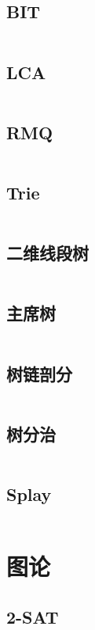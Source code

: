 \documentclass[titlepage,landscape,a4paper,10pt]{article}
\begin{document}
\begin{multicols}{2}
\begin{spacing}{0.8}
\subsection{BIT}
\inputminted{cpp}{DataStructure/BIT.cpp}

\subsection{LCA}
\inputminted{cpp}{DataStructure/LCA.cpp}

\subsection{RMQ}
\inputminted{cpp}{DataStructure/RMQ.cpp}

\subsection{Trie}
\inputminted{cpp}{DataStructure/trie.cpp}

\subsection{二维线段树}
\inputminted{cpp}{DataStructure/二维线段树.cpp}

\subsection{主席树}
\inputminted{cpp}{DataStructure/主席树.cpp}

\subsection{树链剖分}
\inputminted{cpp}{DataStructure/树链剖分.cpp}

\subsection{树分治}
\inputminted{cpp}{DataStructure/树分治.cpp}

\subsection{Splay}
\inputminted{cpp}{DataStructure/Splay.cpp}

\section{图论}

\subsection{2-SAT}
\inputminted{cpp}{Graph/2-SAT.cpp}


\end{spacing}
\end{multicols}
\end{document}
